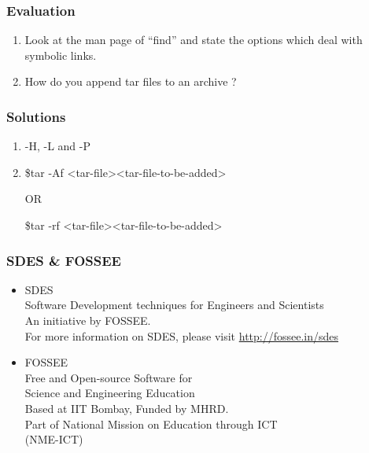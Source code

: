 \documentclass[17pt,compress]{beamer}
\begin{document}
\begin{frame}[fragile]
\frametitle{Evaluation}
\label{sec-9}


\begin{enumerate}
\item Look at the man page of ``find'' and state the options which
    deal with symbolic links.
\vspace{8pt}
\item How do you append tar files to an archive ?
\end{enumerate}
\end{frame}
\begin{frame}
\frametitle{Solutions}

\begin{enumerate}
\item  -H,  -L  and  -P   
\vspace{15pt}
\item \$tar -Af <tar-file><tar-file-to-be-added>
\begin{center}
OR \\
\end{center}
\$tar -rf <tar-file><tar-file-to-be-added>
\end{enumerate}

\end{frame}

\begin{frame}
\frametitle{SDES \& FOSSEE}
\begin{center}
\begin{itemize}
\item \small{SDES}\\
\small{\color{LimeGreen}Software Development techniques for Engineers and Scientists} \\
\scriptsize An initiative by FOSSEE. \\
\vspace{3pt}
\scriptsize For more information on SDES, please visit {\color{blue}\url{http://fossee.in/sdes}}\\
\vspace{10pt}
\item \small{FOSSEE}\\
\small {\color{LimeGreen}Free and Open-source Software for \\Science and Engineering Education} \\
\scriptsize Based at IIT Bombay, Funded by MHRD.\\
\vspace{3pt}
\scriptsize Part of National Mission on Education through ICT \\(NME-ICT) \\
\end{itemize}
\end{center}
\end{frame}
\end{document}
